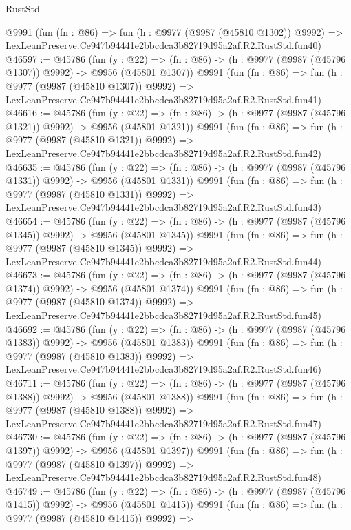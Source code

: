 \begin{lexlean}{RustStd}
\begin{coremodule}
    @9991
    (fun (fn : @86) =>
    fun (h : @9977 (@9987 (@45810 @1302)) @9992) =>
    LexLeanPreserve.Ce947b94441e2bbcdca3b82719d95a2af.R2.RustStd.fun40)
@46597 := @45786
    (fun (y : @22) =>
    (fn : @86) -> (h : @9977 (@9987 (@45796 @1307)) @9992) -> @9956 (@45801 @1307))
    @9991
    (fun (fn : @86) =>
    fun (h : @9977 (@9987 (@45810 @1307)) @9992) =>
    LexLeanPreserve.Ce947b94441e2bbcdca3b82719d95a2af.R2.RustStd.fun41)
@46616 := @45786
    (fun (y : @22) =>
    (fn : @86) -> (h : @9977 (@9987 (@45796 @1321)) @9992) -> @9956 (@45801 @1321))
    @9991
    (fun (fn : @86) =>
    fun (h : @9977 (@9987 (@45810 @1321)) @9992) =>
    LexLeanPreserve.Ce947b94441e2bbcdca3b82719d95a2af.R2.RustStd.fun42)
@46635 := @45786
    (fun (y : @22) =>
    (fn : @86) -> (h : @9977 (@9987 (@45796 @1331)) @9992) -> @9956 (@45801 @1331))
    @9991
    (fun (fn : @86) =>
    fun (h : @9977 (@9987 (@45810 @1331)) @9992) =>
    LexLeanPreserve.Ce947b94441e2bbcdca3b82719d95a2af.R2.RustStd.fun43)
@46654 := @45786
    (fun (y : @22) =>
    (fn : @86) -> (h : @9977 (@9987 (@45796 @1345)) @9992) -> @9956 (@45801 @1345))
    @9991
    (fun (fn : @86) =>
    fun (h : @9977 (@9987 (@45810 @1345)) @9992) =>
    LexLeanPreserve.Ce947b94441e2bbcdca3b82719d95a2af.R2.RustStd.fun44)
@46673 := @45786
    (fun (y : @22) =>
    (fn : @86) -> (h : @9977 (@9987 (@45796 @1374)) @9992) -> @9956 (@45801 @1374))
    @9991
    (fun (fn : @86) =>
    fun (h : @9977 (@9987 (@45810 @1374)) @9992) =>
    LexLeanPreserve.Ce947b94441e2bbcdca3b82719d95a2af.R2.RustStd.fun45)
@46692 := @45786
    (fun (y : @22) =>
    (fn : @86) -> (h : @9977 (@9987 (@45796 @1383)) @9992) -> @9956 (@45801 @1383))
    @9991
    (fun (fn : @86) =>
    fun (h : @9977 (@9987 (@45810 @1383)) @9992) =>
    LexLeanPreserve.Ce947b94441e2bbcdca3b82719d95a2af.R2.RustStd.fun46)
@46711 := @45786
    (fun (y : @22) =>
    (fn : @86) -> (h : @9977 (@9987 (@45796 @1388)) @9992) -> @9956 (@45801 @1388))
    @9991
    (fun (fn : @86) =>
    fun (h : @9977 (@9987 (@45810 @1388)) @9992) =>
    LexLeanPreserve.Ce947b94441e2bbcdca3b82719d95a2af.R2.RustStd.fun47)
@46730 := @45786
    (fun (y : @22) =>
    (fn : @86) -> (h : @9977 (@9987 (@45796 @1397)) @9992) -> @9956 (@45801 @1397))
    @9991
    (fun (fn : @86) =>
    fun (h : @9977 (@9987 (@45810 @1397)) @9992) =>
    LexLeanPreserve.Ce947b94441e2bbcdca3b82719d95a2af.R2.RustStd.fun48)
@46749 := @45786
    (fun (y : @22) =>
    (fn : @86) -> (h : @9977 (@9987 (@45796 @1415)) @9992) -> @9956 (@45801 @1415))
    @9991
    (fun (fn : @86) =>
    fun (h : @9977 (@9987 (@45810 @1415)) @9992) =>

\end{coremodule}
\end{lexlean}
